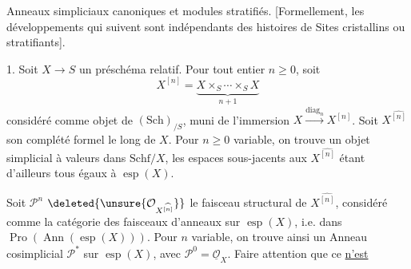 
Anneaux simpliciaux canoniques et modules
stratifiés. 
[Formellement, les développements qui suivent sont indépendants
des  histoires de Sites cristallins ou
stratifiants].

1. Soit $X\longrightarrow S$ un préschéma relatif.
Pour tout entier $n\geq0$, soit
\[
X^{[n]}=\underbrace{X\times_S\cdots\times_S X}_{n+1}
\]
considéré comme objet 
de $(\mathrm{Sch})_{/S}$, muni de 
l'immersion
$X\xrightarrow{\operatorname{diag}_n}X^{[n]}$.
Soit $X^{\widehat{[n]}}$ son complété formel le long de $X$.
Pour $n\geq0$ variable, on trouve un objet simplicial à valeurs
dans $\mathrm{Schf}/X$, les espaces sous-jacents aux
$X^{\widehat{[n]}}$ étant d'ailleurs tous égaux à $\operatorname{esp}(X)$.

Soit $\mathcal P^n$
$\deleted{\unsure{\mathcal O_{X^{\widehat{[n]}}}}}$
le faisceau structural de $X^{\widehat{[n]}}$,
 considéré comme
la catégorie des faisceaux d'anneaux sur $\operatorname{esp}(X)$,
i.e. dans $\operatorname{Pro}(\operatorname{Ann}(\operatorname{esp}(X)))$.
Pour $n$ variable, on trouve ainsi un Anneau cosimplicial
$\mathcal P^*$ sur $\operatorname{esp}(X)$, avec
$\mathcal P^0=\underline{\mathcal O}_X$.
Faire attention que ce \uline{n'est}
